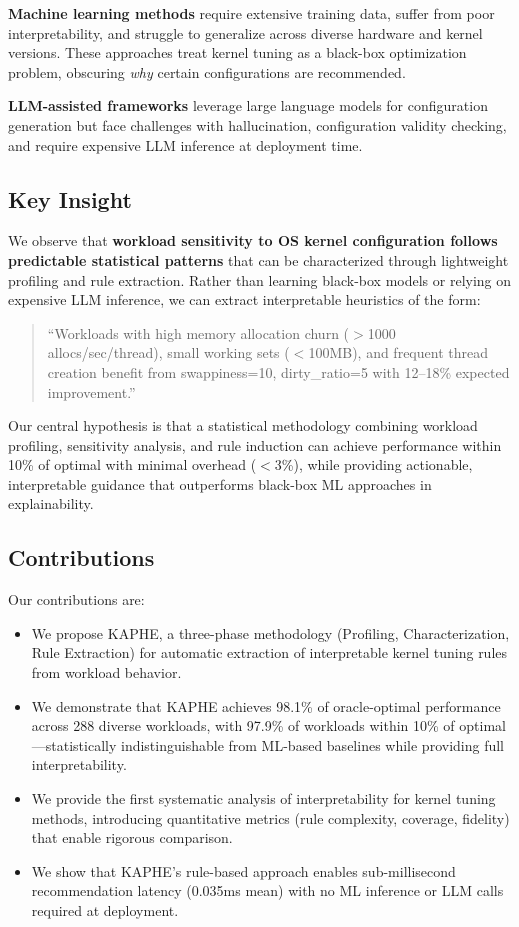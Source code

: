 \documentclass[11pt,a4paper]{article}
\begin{document}
\textbf{Machine learning methods} \citep{jam2025mlkaps, liu2021gptune} require extensive training data, suffer from poor interpretability, and struggle to generalize across diverse hardware and kernel versions. These approaches treat kernel tuning as a black-box optimization problem, obscuring \emph{why} certain configurations are recommended.

\textbf{LLM-assisted frameworks} \citep{chen2024autoos, osr1_2025} leverage large language models for configuration generation but face challenges with hallucination, configuration validity checking, and require expensive LLM inference at deployment time.

\subsection{Key Insight}

We observe that \textbf{workload sensitivity to OS kernel configuration follows predictable statistical patterns} that can be characterized through lightweight profiling and rule extraction. Rather than learning black-box models or relying on expensive LLM inference, we can extract interpretable heuristics of the form:

\begin{quote}
\small
``Workloads with high memory allocation churn ($>$1000 allocs/sec/thread), small working sets ($<$100MB), and frequent thread creation benefit from swappiness=10, dirty\_ratio=5 with 12--18\% expected improvement.''
\end{quote}

Our central hypothesis is that a statistical methodology combining workload profiling, sensitivity analysis, and rule induction can achieve performance within 10\% of optimal with minimal overhead ($<$3\%), while providing actionable, interpretable guidance that outperforms black-box ML approaches in explainability.

\subsection{Contributions}

Our contributions are:
\begin{itemize}
    \item We propose KAPHE, a three-phase methodology (Profiling, Characterization, Rule Extraction) for automatic extraction of interpretable kernel tuning rules from workload behavior.
    \item We demonstrate that KAPHE achieves 98.1\% of oracle-optimal performance across 288 diverse workloads, with 97.9\% of workloads within 10\% of optimal---statistically indistinguishable from ML-based baselines while providing full interpretability.
    \item We provide the first systematic analysis of interpretability for kernel tuning methods, introducing quantitative metrics (rule complexity, coverage, fidelity) that enable rigorous comparison.
    \item We show that KAPHE's rule-based approach enables sub-millisecond recommendation latency (0.035ms mean) with no ML inference or LLM calls required at deployment.
\end{itemize}
\end{document}

